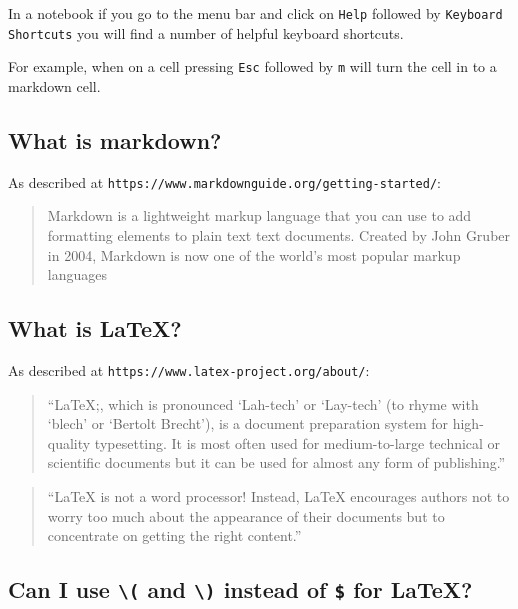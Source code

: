In a notebook if you go to the menu bar and click on \texttt{Help} followed by
\texttt{Keyboard Shortcuts} you will find a number of helpful keyboard shortcuts.


For example, when on a cell pressing \texttt{Esc} followed by \texttt{m} will turn the cell in
to a markdown cell.


\subsection{What is markdown?}

As described at \texttt{https://www.markdownguide.org/getting-started/}:

\begin{quote}
Markdown is a lightweight markup language that you can use to add formatting
elements to plain text text documents. Created by John Gruber in 2004,
Markdown is now one of the world’s most popular markup languages
\end{quote}


\subsection{What is LaTeX?}

As described at \texttt{https://www.latex-project.org/about/}:

\begin{quote}
``LaTeX;, which is pronounced `Lah-tech' or `Lay-tech' (to rhyme with `blech' or
`Bertolt Brecht'), is a document preparation system for high-quality
typesetting. It is most often used for medium-to-large technical or scientific
documents but it can be used for almost any form of publishing.''
\end{quote}

\begin{quote}
``LaTeX\; is not a word processor! Instead, LaTeX\; encourages authors not to worry
too much about the appearance of their documents but to concentrate on getting
the right content.''
\end{quote}

\subsection{Can I use \texttt{\textbackslash(} and \texttt{\textbackslash)} instead of \texttt{\$} for \LaTeX?}
\label{sec:can_i_use_different_latex_delimiters_in_latex}

